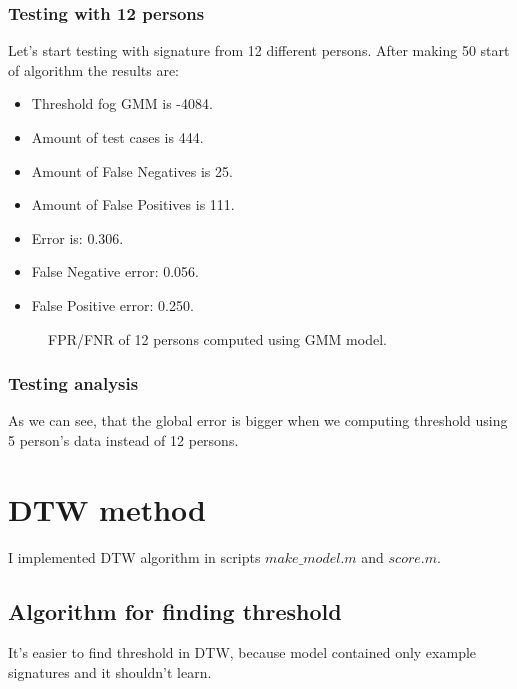 \documentclass{article}
\begin{document}
\subsubsection{Testing with 12 persons}
Let's start testing with signature from 12 different persons.
After making 50 start of algorithm the results are:


\begin{itemize}
    \item Threshold fog GMM is -4084.
    \item Amount of test cases is 444.
    \item Amount of False Negatives is 25.
    \item Amount of False Positives is 111.
    \item Error is: 0.306.
    \item False Negative error: 0.056.
    \item False Positive error: 0.250.
\end{itemize}

\begin{figure}[htbp] 
    \centering
    \def\svgscale{0.6}
    
    \caption{FPR/FNR of 12 persons computed using GMM model.}
    \label{GMM_12persons}
\end{figure}

\newpage

\subsubsection{Testing analysis}
As we can see, that the global error is bigger when we computing threshold using 5 person's data instead of 12 persons.

\section{DTW method}

I implemented DTW algorithm in scripts \(make\_model.m\) and \(score.m\).

\subsection{Algorithm for finding threshold}
It's easier to find threshold in DTW, because model contained only example signatures and it shouldn't learn.
\end{document}
